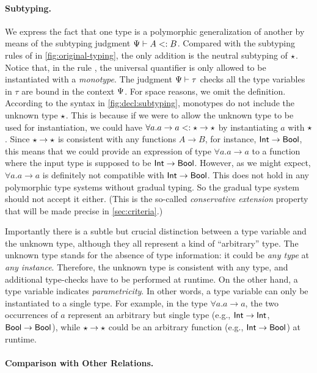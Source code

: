 \paragraph{Subtyping.}

We express the fact that one type is a polymorphic generalization of another by
means of the subtyping judgment $\Psi \vdash A <: B$. Compared with the
subtyping rules of \citet{odersky1996putting} in
\cref{fig:original-typing}, the only addition is the neutral subtyping of
$\star$. Notice
that, in the rule
, the universal quantifier is only allowed to be instantiated
with a \emph{monotype}.
The judgment $\Psi \vdash \tau$ checks all the type variables in $\tau$ are
bound in the context $\Psi$. For space reasons, we omit the definition.
According to the syntax in \cref{fig:decl:subtyping},
monotypes do not include the unknown type $\star$. This is because if we were
to allow the unknown type to be used for instantiation, we could have  $  \forall a . a \to a <: \star \to \star $
by instantiating $a$ with $\star$. Since $\star \to \star$ is
consistent with any functions $A \to B$, for instance, $\mathsf{Int} \to \mathsf{Bool}$, this
means that we could provide an expression of type $\forall a. a \to a$ to a
function where the input type is supposed to be $\mathsf{Int} \to \mathsf{Bool}$. However, as we
might expect, $\forall a. a \to a$ is definitely not compatible with $\mathsf{Int} \to
\mathsf{Bool}$. This does not hold in any polymorphic type systems without gradual
typing. So the gradual type system should not accept it either. (This is the
so-called \textit{conservative extension} property that will be made precise in
\cref{sec:criteria}.)

Importantly there is a subtle but crucial distinction between a type variable
and the unknown type, although they all represent a kind of ``arbitrary'' type.
The unknown type stands for the absence of type information: it could be
\textit{any type} at \textit{any instance}. Therefore, the unknown type is
consistent with any type, and additional type-checks have to be performed at
runtime. On the other hand, a type variable indicates \textit{parametricity}.
In other words, a
type variable can only be instantiated to a single type. For example, in the
type $\forall a. a \to a$, the two occurrences of $a$ represent an arbitrary but
single type (e.g., $\mathsf{Int} \to \mathsf{Int}$, $\mathsf{Bool} \to \mathsf{Bool}$), while $\star \to
\star$ could be an arbitrary function (e.g., $\mathsf{Int} \to \mathsf{Bool}$) at runtime.

\paragraph{Comparison with Other Relations.}

